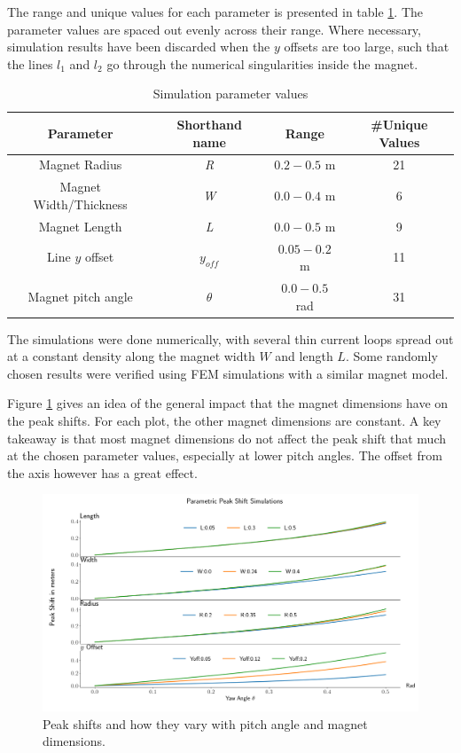 The range and unique values for each parameter is presented in table \ref{tab:parameter-vals}.
The parameter values are spaced out evenly across their range. Where necessary, simulation
results have been discarded when the $y$ offsets are too large, such that the lines $l_1$
and $l_2$ go through the numerical singularities inside the magnet.

\begin{table}[h!]
    \begin{center}
        \begin{tabular}{c c c c}
            Parameter              & Shorthand name & Range         & \#Unique Values \\
            \hline
            Magnet Radius          & \emph{R}       & $0.2-0.5$ m   & 21              \\
            Magnet Width/Thickness & \emph{W}       & $0.0-0.4$ m   & 6               \\
            Magnet Length          & \emph{L}       & $0.0-0.5$ m   & 9               \\
            Line $y$ offset        & $y_{off}$      & $0.05-0.2$ m  & 11              \\
            Magnet pitch angle       & $\theta$       & $0.0-0.5$ rad & 31
        \end{tabular}
        \caption{Simulation parameter values}
        \label{tab:parameter-vals}
    \end{center}
\end{table}

The simulations were done numerically, with several thin
current loops spread out at a constant density along the magnet
width $W$ and length $L$. Some randomly chosen results were
verified using FEM simulations with a similar magnet model.

Figure \ref{fig:sim-mag-dimensions} gives an idea of the general impact that the
magnet dimensions have on the peak shifts. For each plot, the other magnet dimensions
are constant. A key takeaway is that most magnet dimensions do not affect
the peak shift that much at the chosen parameter values, especially at
lower pitch angles. The offset from the axis however has a great effect.


\begin{figure}
    \centering
    \includegraphics[width=\linewidth]{figs/sim_params_plot}
    \caption{Peak shifts and how they vary with pitch angle and magnet dimensions.}
    \label{fig:sim-mag-dimensions}
\end{figure}

